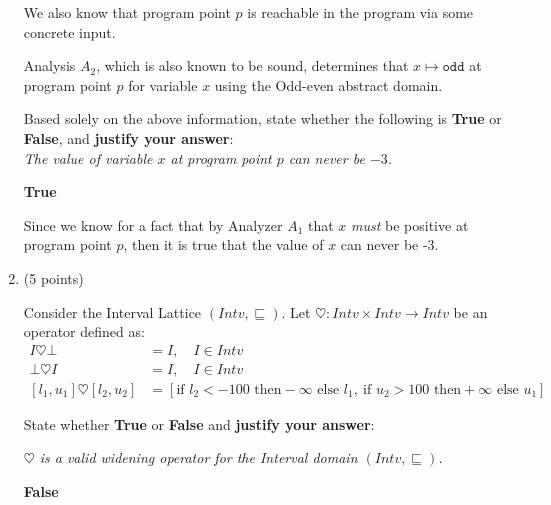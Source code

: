 \documentclass[12pt]{article}
\begin{document}
\begin{enumerate}
We also know that program point $p$ is reachable in the program via some
concrete input.

Analysis $A_2$, which is also known to be sound, determines that 
 $x \mapsto \texttt{odd}$ 
at program point $p$ for variable $x$ using the Odd-even abstract domain. 

Based solely on the above information, state whether the following is \textbf{True} or \textbf{False},
and \textbf{justify your answer}: \\
\emph{The value of variable $x$ at program point $p$ can never be $-3$.}
\begin{mdframed}
\textbf{True} 

Since we know for a fact that by Analyzer $A_1$ that $x$ \textit{must} be positive at program point $p$, then it is true that the value of $x$ can never be -3.

\end{mdframed}

\newpage


\item  (5 points)

  Consider the Interval Lattice $(Intv, \sqsubseteq)$.
  Let $\heartsuit: Intv \times Intv \to Intv$ be an operator 
   defined as: 
   \begin{align*}
   I \heartsuit \bot &= I, \hspace{1em} I \in Intv \\
   \bot \heartsuit I &= I,\hspace{1em} I \in Intv\\
   [l_1, u_1] \heartsuit [l_2, u_2] &= [\text{if } l_2 < -100 \text { then} -\!\infty \text{ else } l_1,\ 
                                        \text{if } u_2 > 100 \text { then} +\!\infty \text{ else } u_1]
   \end{align*}                                       
   
  State whether \textbf{True} or \textbf{False} and \textbf{justify your answer}: 
 
  \emph{$\heartsuit$ is a valid widening operator for the Interval domain $(Intv, \sqsubseteq)$.}
 
   \begin{mdframed}


     \textbf{False}


\end{mdframed}
\end{enumerate}
\end{document}
